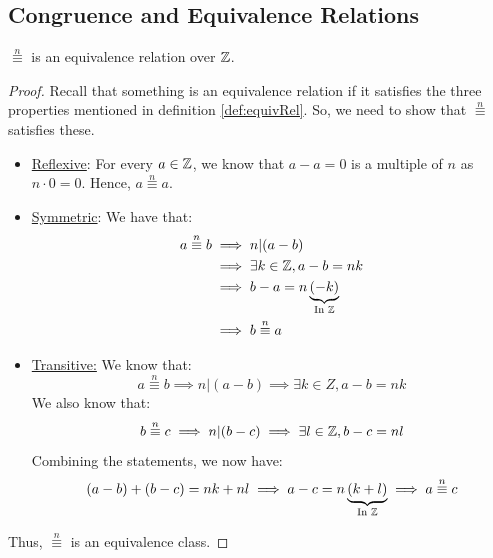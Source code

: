 \documentclass[letterpaper]{article}
\begin{document}
\subsection{Congruence and Equivalence Relations}
\begin{lemma}{}{}
    $\overset{n}{\equiv}$ is an equivalence relation over $\mathbb{Z}$. 
\end{lemma}
\begin{proof}
    Recall that something is an equivalence relation if it satisfies the three properties mentioned in definition \ref{def:equivRel}. So, we need to show that $\overset{n}{\equiv}$ satisfies these. 
    \begin{itemize}
        \item \underline{Reflexive}: For every $a \in \mathbb{Z}$, we know that $a - a = 0$ is a multiple of $n$ as $n \cdot 0 = 0$. Hence, $a \overset{n}{\equiv} a$. 
        \item \underline{Symmetric}: We have that: 
        \begin{equation*}
            \begin{aligned}
                a \overset{n}{\equiv} b &\implies n | (a - b) \\ 
                    &\implies \exists k \in \mathbb{Z}, a - b = nk \\ 
                    &\implies b - a = n\underbrace{(-k)}_{\text{In } \mathbb{Z}} \\ 
                    &\implies b \overset{n}{\equiv} a
            \end{aligned}
        \end{equation*}

        \item \underline{Transitive:} We know that:
        \[a \overset{n}{\equiv} b \implies n | (a - b) \implies \exists k \in Z, a - b = nk\]
        We also know that:
        \[b \overset{n}{\equiv} c \implies n | (b - c) \implies \exists l \in \mathbb{Z}, b - c = nl\]
        Combining the statements, we now have:
        \[(a - b) + (b - c) = nk + nl \implies a - c = n\underbrace{(k + l)}_{\text{In } \mathbb{Z}} \implies a \overset{n}{\equiv} c\]
    \end{itemize}
    Thus, $\overset{n}{\equiv}$ is an equivalence class. 
\end{proof}
\end{document}
